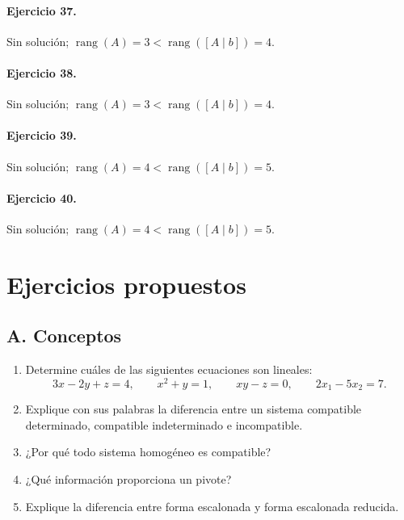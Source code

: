 \documentclass[12pt]{article}
\theoremstyle{remark}
\begin{document}
\paragraph{Ejercicio 37.} Sin solución; \(\operatorname{rang}(A)=3<\operatorname{rang}([A\mid b])=4\).
\paragraph{Ejercicio 38.} Sin solución; \(\operatorname{rang}(A)=3<\operatorname{rang}([A\mid b])=4\).
\paragraph{Ejercicio 39.} Sin solución; \(\operatorname{rang}(A)=4<\operatorname{rang}([A\mid b])=5\).
\paragraph{Ejercicio 40.} Sin solución; \(\operatorname{rang}(A)=4<\operatorname{rang}([A\mid b])=5\).

\section{Ejercicios propuestos}

\subsection*{A. Conceptos}
\begin{enumerate}
\item Determine cuáles de las siguientes ecuaciones son lineales:
\[
3x-2y+z=4,\qquad x^2+y=1,\qquad xy-z=0,\qquad 2x_1-5x_2=7.
\]
\item Explique con sus palabras la diferencia entre un sistema compatible determinado, compatible
indeterminado e incompatible.
\item ¿Por qué todo sistema homogéneo es compatible?
\item ¿Qué información proporciona un pivote?
\item Explique la diferencia entre forma escalonada y forma escalonada reducida.
\end{enumerate}
\end{document}
